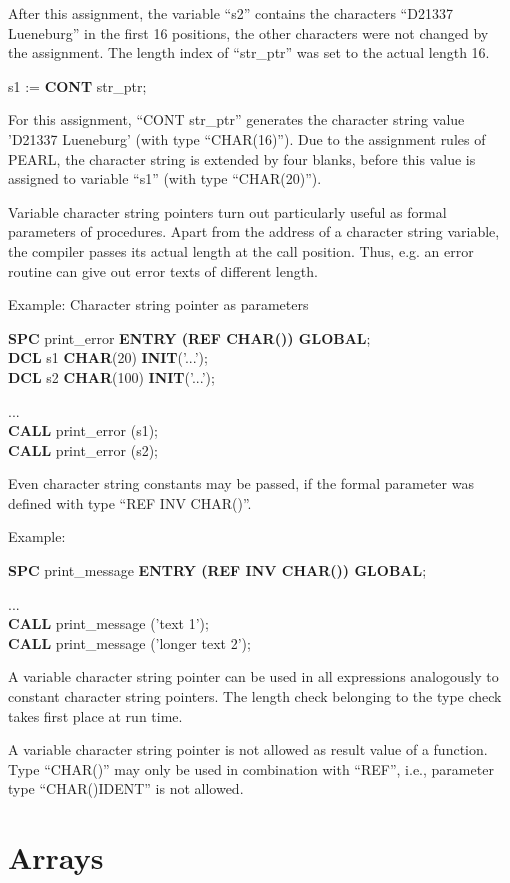 \begin{tobedone}
After this assignment, the variable ``s2'' contains the characters
``D21337 Lueneburg'' in the first 16 positions, the other characters
were not changed by the assignment. The length index of ``str\_ptr'' was
set to the actual length 16.

s1 := {\bf CONT} str\_ptr;

For this assignment, ``CONT str\_ptr'' generates the character string
value 'D21337 Lueneburg' (with type ``CHAR(16)''). Due to the assignment
rules of PEARL, the character string is extended by four blanks, before
this value is assigned to variable ``s1'' (with type ``CHAR(20)'').

Variable character string pointers turn out particularly useful as
formal parameters of procedures. Apart from the address of a character
string variable, the compiler passes its actual length at the call
position.  Thus, e.g. an error routine can give out error texts of
different length.

Example: Character string pointer as parameters

{\bf SPC} print\_error {\bf ENTRY (REF CHAR()) GLOBAL};\\
{\bf DCL} s1 {\bf CHAR}(20)  {\bf INIT}('...');\\
{\bf DCL} s2 {\bf CHAR}(100) {\bf INIT}('...');

...\\
{\bf CALL} print\_error (s1);\\
{\bf CALL} print\_error (s2);

Even character string constants may be passed, if the formal parameter
was defined with type ``REF INV CHAR()''.

Example:

{\bf SPC} print\_message {\bf ENTRY (REF INV CHAR()) GLOBAL};

...\\
{\bf CALL} print\_message ('text 1');\\
{\bf CALL} print\_message ('longer text 2');

A variable character string pointer can be used in all expressions
analogously to constant character string pointers. The length check
belonging to the type check takes first place at run time.

A variable character string pointer is not allowed as result value of a
function. Type ``CHAR()'' may only be used in combination with ``REF'',
i.e., parameter type ``CHAR()IDENT'' is not allowed.

\section{Arrays}   %


\end{tobedone}
